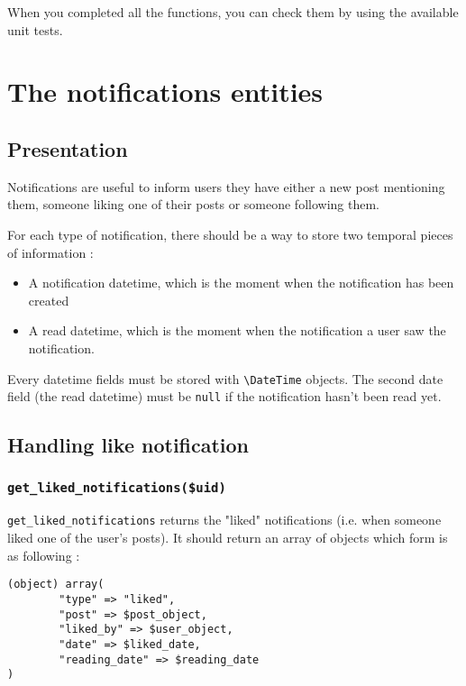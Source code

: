 \documentclass[twoside,a4paper,12pt]{article}
\begin{document}
When you completed all the functions, you can check them by using the available unit tests.

\section{The notifications entities}

\subsection{Presentation}

Notifications are useful to inform users they have either a new post mentioning them, someone liking one of their posts or someone following them.

For each type of notification, there should be  a way to store two temporal pieces of information :

\begin{itemize}
\item A notification datetime, which is the moment when the notification has been created
\item A read datetime, which is the moment when the notification a user saw the notification.
\end{itemize}

Every datetime fields must be stored with \texttt{\textbackslash DateTime} objects. The second date field (the read datetime) must be \texttt{null} if the notification hasn't been read yet.

\subsection{Handling like notification}

\subsubsection{\texttt{get\_liked\_notifications(\$uid)}}
\texttt{get\_liked\_notifications} returns the "liked" notifications (i.e. when someone liked one of the user's posts). It should return an array of objects which form is as following :

\begin{lstlisting}
(object) array(
        "type" => "liked",
        "post" => $post_object,
        "liked_by" => $user_object,
        "date" => $liked_date,
        "reading_date" => $reading_date
)
\end{lstlisting}
\end{document}
